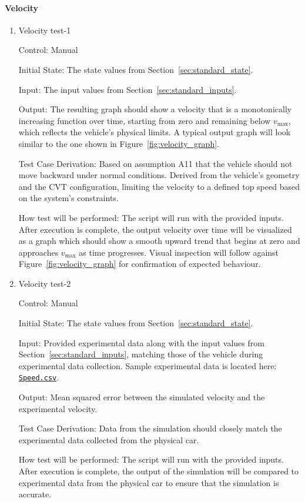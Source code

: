 \documentclass[12pt, titlepage]{article}
\newcommand{\refdata}[2]{
  \href{https://github.com/gr812b/CVT-Simulator/blob/main/experimental-data/#1
  }{\texttt{#2}}}
\begin{document}
\paragraph{Velocity}

\begin{enumerate}

\item{Velocity test-1\\}

Control: Manual
					
Initial State: The state values from Section~\ref{sec:standard_state}.

Input: The input values from Section~\ref{sec:standard_inputs}.
					
Output: The resulting graph should show a velocity that is a monotonically increasing function over time, starting from zero and remaining below $v_\text{max}$, which reflects the vehicle’s physical limits. A typical output graph will look similar to the one shown in Figure~\ref{fig:velocity_graph}.

Test Case Derivation: Based on assumption A11 that the vehicle should not move backward under normal conditions.
Derived from the vehicle’s geometry and the CVT configuration, limiting the velocity to a defined top speed based on the system’s constraints.


How test will be performed: The script will run with the provided inputs. After execution is complete, the output velocity over time will be visualized as a graph which should show a smooth upward trend that begins at zero and approaches $v_\text{max}$ as time progresses. Visual inspection will follow against Figure~\ref{fig:velocity_graph} for confirmation of expected behaviour.
					
\item{Velocity test-2\\}

Control: Manual

Initial State: The state values from Section~\ref{sec:standard_state}.

Input: Provided experimental data along with the input values from Section~\ref{sec:standard_inputs}, matching those of the vehicle during experimental data collection. Sample experimental data is located here: \refdata{GPS\%20SPEED.csv}{Speed.csv}.

Output: Mean squared error between the simulated velocity and the experimental velocity.

Test Case Derivation: Data from the simulation should closely match the experimental data collected from the physical car.

How test will be performed: The script will run with the provided inputs. After execution is complete, the output of the simulation will be compared to experimental data from the physical car to ensure that the simulation is accurate.

\end{enumerate}
\end{document}
